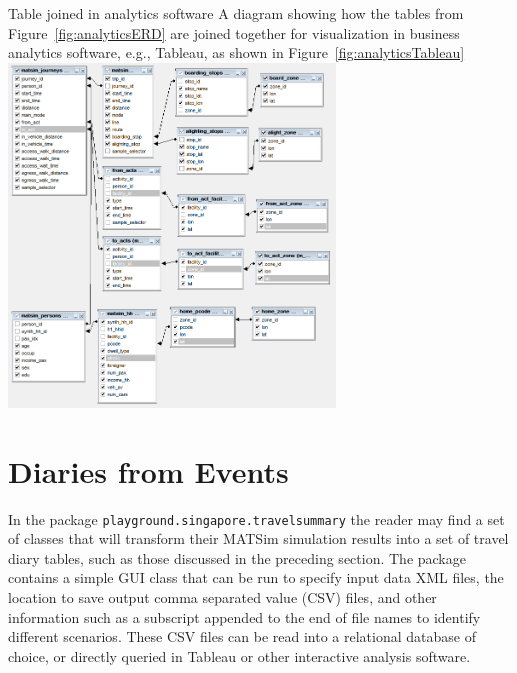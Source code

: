 \createfigure%
{Table joined in analytics software}%
{A diagram showing how the tables from Figure~\ref{fig:analyticsERD} are joined together for visualization in business analytics software, e.g., Tableau, as shown in Figure~\ref{fig:analyticsTableau}}%
{\label{fig:analyticsJoin}}%
{\includegraphics[width=0.65\textwidth, angle=0]{extending/figures/businessanalytics/join}}%
{}

\section{Diaries from Events}
In the package \lstinline|playground.singapore.travelsummary| the reader may find a set of classes that will transform their MATSim simulation results into a set of travel diary tables, such as those discussed in the preceding section. The package contains a simple GUI class that can be run to specify input data XML files, the location to save output comma separated value (CSV) files, and other information such as a subscript appended to the end of file names to identify different scenarios. These CSV files can be read into a relational database of choice, or directly queried in Tableau or other interactive analysis software.





